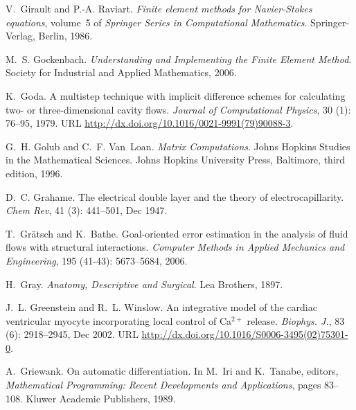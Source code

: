 \begin{thebibliography}{467}
V.~Girault and P.-A. Raviart.
\newblock \emph{Finite element methods for {N}avier-{S}tokes equations},
  volume~5 of \emph{Springer Series in Computational Mathematics}.
\newblock Springer-Verlag, Berlin, 1986.

M.~S. Gockenbach.
\newblock \emph{Understanding and Implementing the Finite Element Method}.
\newblock Society for Industrial and Applied Mathematics, 2006.

K.~Goda.
\newblock A multistep technique with implicit difference schemes for
  calculating two- or three-dimensional cavity flows.
\newblock \emph{Journal of Computational Physics}, 30 (1):
  76--95, 1979.
\newblock URL \url{http://dx.doi.org/10.1016/0021-9991(79)90088-3}.

G.~H. Golub and C.~F. Van~Loan.
\newblock \emph{Matrix Computations}.
\newblock Johns Hopkins Studies in the Mathematical Sciences. Johns Hopkins
  University Press, Baltimore, third edition, 1996.

D.~C. Grahame.
\newblock The electrical double layer and the theory of electrocapillarity.
\newblock \emph{Chem Rev}, 41 (3): 441--501, Dec 1947.

T.~Gr\"{a}tsch and K.~Bathe.
\newblock Goal-oriented error estimation in the analysis of fluid flows with
  structural interactions.
\newblock \emph{Computer Methods in Applied Mechanics and Engineering},
  195 (41-43): 5673--5684, 2006.

H.~Gray.
\newblock \emph{Anatomy, Descriptive and Surgical}.
\newblock Lea Brothers, 1897.

J.~L. Greenstein and R.~L. Winslow.
\newblock An integrative model of the cardiac ventricular myocyte incorporating
  local control of {C}a$^{2+}$ release.
\newblock \emph{Biophys. J.}, 83 (6): 2918--2945, Dec 2002.
\newblock URL \url{http://dx.doi.org/10.1016/S0006-3495(02)75301-0}.

A.~Griewank.
\newblock On automatic differentiation.
\newblock In M.~Iri and K.~Tanabe, editors, \emph{Mathematical Programming:
  Recent Developments and Applications}, pages 83--108. Kluwer Academic
  Publishers, 1989.


\end{thebibliography}
